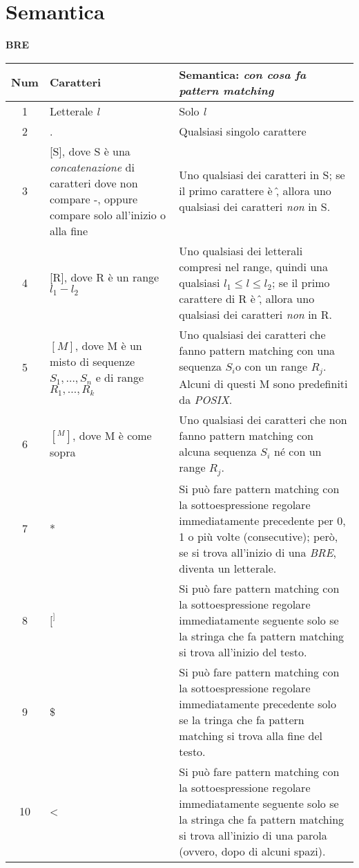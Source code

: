 \section{Semantica}
\begin{center}
	\textbf{BRE}\\
	\begin{tabular}{|c|p{3cm}|p{10cm}|}
	\hline
		\textbf{Num} & \textbf{Caratteri} & \textbf{Semantica: \textit{con cosa fa pattern matching}} \\ \hline
		1	& Letterale \textit{l}	& Solo \textit{l} \\ \hline
		2	& .			& Qualsiasi singolo carattere \\ \hline
		3	& [S], dove S è una \textit{concatenazione} di caratteri dove non compare -, oppure compare solo all'inizio o alla fine	& Uno qualsiasi dei caratteri in S; se il primo carattere è \^, allora uno qualsiasi dei caratteri \textit{non} in S. \\ \hline
		4	& [R], dove R è un range $ l_{1} - l_{2} $	& Uno qualsiasi dei letterali compresi nel range, quindi una qualsiasi $ l_{1} \leq l \leq l_{2} $; se il primo carattere di R è \^, allora uno qualsiasi dei caratteri \textit{non} in R. \\ \hline
		5	& $ [M] $, dove M è un misto di sequenze $ S_{1},\ldots,S_{n} $ e di range $ R_{1},\ldots,R_{k}	$ & Uno qualsiasi dei caratteri che fanno pattern matching con una sequenza $ S_{i} $o con un range $ R_{j} $. Alcuni di questi M sono predefiniti da \textit{POSIX}. \\ \hline
		6	& $ [^M] $, dove M è come sopra	& Uno qualsiasi dei caratteri che non fanno pattern matching con alcuna sequenza $ S_{i} $ né con un range $ R_{j} $. \\ \hline
		7	& *			& Si può fare pattern matching con la sottoespressione regolare immediatamente precedente per 0, 1 o più volte (consecutive); però, se si trova all'inizio di una \textit{BRE}, diventa un letterale. \\ \hline
		8	& $ [^] $		&
		 Si può fare pattern matching con la sottoespressione regolare immediatamente seguente solo se la stringa che fa pattern matching si trova all'inizio del testo. \\ \hline
		9	& \$			& Si può fare pattern matching con la sottoespressione regolare immediatamente precedente solo se la tringa che fa pattern matching si trova alla fine del testo. \\ \hline
		10	& <			& Si può fare pattern matching con la sottoespressione regolare immediatamente seguente solo se la stringa che fa pattern matching si trova all'inizio di una parola (ovvero, dopo di alcuni spazi). \\ \hline

\end{tabular}
\end{center}
